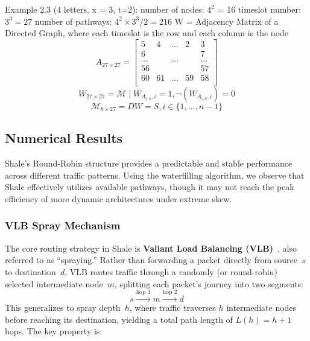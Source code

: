 \documentclass{article}
\begin{document}
\begin{enumerate}
            Example 2.3 (4 letters, x = 3, t=2):
            number of nodes: $4^{2}$ = 16
            timeslot number: $3^{3} = 27$
            number of pathways: $4^{2} \times 3^{3}/2 = 216$
            W = Adjacency Matrix of a Directed Graph, where each timeslot is the
            row and each column is the node
            \[
                A_{27 \times 27}=
                \begin{bmatrix}
                    5   & 4  & ... & 2  & 3   \\
                    6   &    &     &    & 7   \\
                    ... &    & ... &    & ... \\
                    56  &    &     &    & 57  \\
                    60  & 61 & ... & 59 & 58  \\
                \end{bmatrix}
            \]
            \[
                W_{27 \times 27}= \mathscr{M}\mid W_{A_{i,k},i}= 1, \neg(W_{A_{i,k},i}
                ) = 0
            \]
            \[
                \mathscr{M}_{b \times 27}= DW = S, i \in \{1, ... ,n-1\}
            \]
    \end{enumerate}

    \subsection{Numerical Results}
    Shale's Round-Robin structure provides a predictable and stable performance across different traffic patterns. Using the waterfilling algorithm, we observe that Shale effectively utilizes available pathways, though it may not reach the peak efficiency of more dynamic architectures under extreme skew.

    \subsubsection{VLB Spray Mechanism}
    The core routing strategy in Shale is \textbf{Valiant Load Balancing (VLB)}~\cite{shale}, also referred to as ``spraying.'' Rather than forwarding a packet directly from source~$s$ to destination~$d$, VLB routes traffic through a randomly (or round-robin) selected intermediate node~$m$, splitting each packet's journey into two segments:
    \[
        s \xrightarrow{\text{hop 1}} m \xrightarrow{\text{hop 2}} d
    \]
    This generalizes to spray depth~$h$, where traffic traverses $h$ intermediate nodes before reaching its destination, yielding a total path length of $L(h) = h + 1$ hops. The key property is:
\end{document}
